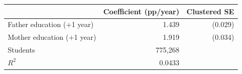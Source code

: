 \begin{tabular}{lrr}
\hline
 & Coefficient (pp/year) & Clustered SE \\
\hline
Father education (+1 year) & 1.439 & (0.029) \\
Mother education (+1 year) & 1.919 & (0.034) \\
Students & 775,268 & \\
$R^2$ & 0.0433 & \\
\hline
\end{tabular}
